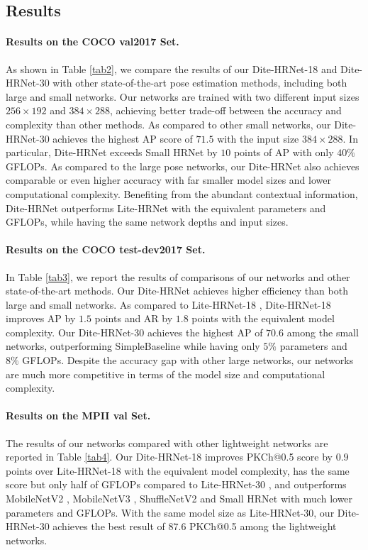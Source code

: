 \documentclass{article}
\begin{document}
\subsection{Results}

\paragraph{Results on the COCO val2017 Set.} As shown in Table \ref{tab2}, we compare the results of our Dite-HRNet-18 and Dite-HRNet-30 with other state-of-the-art pose estimation methods, including both large and small networks. Our networks are trained with two different input sizes $256 \times 192$ and $384 \times 288$, achieving better trade-off between the accuracy and complexity than other methods. As compared to other small networks, our Dite-HRNet-30 achieves the highest AP score of $71.5$ with the input size $384 \times 288$. In particular, Dite-HRNet exceeds Small HRNet \cite{wang:smallhrnet} by $10$ points of AP with only $40\%$ GFLOPs. As compared to the large pose networks, our Dite-HRNet also achieves comparable or even higher accuracy with far smaller model sizes and lower computational complexity. Benefiting from the abundant contextual information, Dite-HRNet outperforms Lite-HRNet \cite{yu:litehrnet} with the equivalent parameters and GFLOPs, while having the same network depths and input sizes.

\paragraph{Results on the COCO test-dev2017 Set.} In Table \ref{tab3}, we report the results of comparisons of our networks and other state-of-the-art methods. Our Dite-HRNet achieves higher efficiency than both large and small networks. As compared to Lite-HRNet-18 \cite{yu:litehrnet}, Dite-HRNet-18 improves AP by $1.5$ points and AR by $1.8$ points with the equivalent model complexity. Our Dite-HRNet-30 achieves the highest AP of $70.6$ among the small networks, outperforming SimpleBaseline \cite{xiao:simple} while having only $5\%$ parameters and $8\%$ GFLOPs. Despite the accuracy gap with other large networks, our networks are much more competitive in terms of the model size and computational complexity.

\paragraph{Results on the MPII val Set.} The results of our networks compared with other lightweight networks are reported in Table \ref{tab4}. Our Dite-HRNet-18 improves PKCh@0.5 score by $0.9$ points over Lite-HRNet-18 \cite{yu:litehrnet} with the equivalent model complexity, has the same score but only half of GFLOPs compared to Lite-HRNet-30 \cite{yu:litehrnet}, and outperforms MobileNetV2 \cite{sandler:mobile2}, MobileNetV3 \cite{howard:mobile3}, ShuffleNetV2 \cite{ma:shuffle2} and Small HRNet \cite{wang:smallhrnet} with much lower parameters and GFLOPs. With the same model size as Lite-HRNet-30, our Dite-HRNet-30 achieves the best result of $87.6$ PKCh@0.5 among the lightweight networks.
\end{document}
